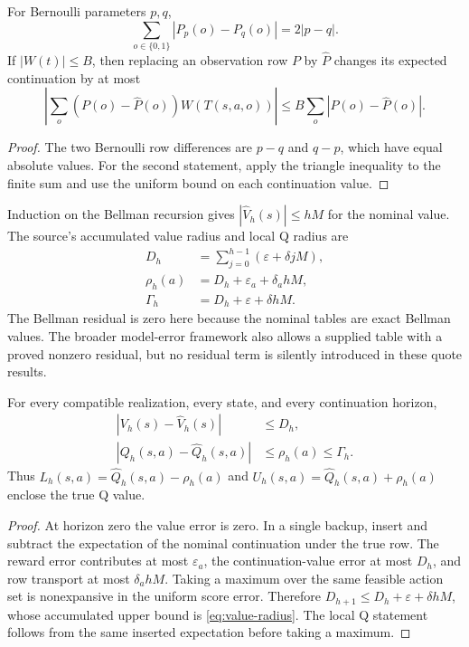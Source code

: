 \begin{lemma}
For Bernoulli parameters $p,q$,
\[
 \sum_{o\in\{0,1\}}|P_p(o)-P_q(o)|=2|p-q|.
\]
If $|W(t)|\leq B$, then replacing an observation row $P$ by $\widehat P$
changes its expected continuation by at most
\[
 \left|\sum_o(P(o)-\widehat P(o))W(T(s,a,o))\right|
 \leq B\sum_o|P(o)-\widehat P(o)|.
\]
\end{lemma}
\begin{proof}
The two Bernoulli row differences are $p-q$ and $q-p$, which have equal
absolute values. For the second statement, apply the triangle inequality to the
finite sum and use the uniform bound on each continuation value.
\end{proof}

Induction on the Bellman recursion gives $|\widehat V_h(s)|\leq hM$ for the
nominal value. The source's accumulated value radius and local Q radius are
\begin{align}
 D_h&=\sum_{j=0}^{h-1}(\varepsilon+\delta jM),\label{eq:value-radius}\\
 \rho_h(a)&=D_h+\varepsilon_a+\delta_a hM,\label{eq:local-radius}\\
 \Gamma_h&=D_h+\varepsilon+\delta hM.\label{eq:global-radius}
\end{align}
The Bellman residual is zero here because the nominal tables are exact Bellman
values. The broader model-error framework also allows a supplied table with a
proved nonzero residual, but no residual term is silently introduced in these
quote results.

\begin{theorem}
For every compatible realization, every state, and every continuation horizon,
\begin{align}
 |V_h(s)-\widehat V_h(s)|&\leq D_h,\\
 |Q_h(s,a)-\widehat Q_h(s,a)|&\leq\rho_h(a)\leq\Gamma_h.
\end{align}
Thus $L_h(s,a)=\widehat Q_h(s,a)-\rho_h(a)$ and
$U_h(s,a)=\widehat Q_h(s,a)+\rho_h(a)$ enclose the true Q value.
\end{theorem}
\begin{proof}
At horizon zero the value error is zero. In a single backup, insert and subtract
the expectation of the nominal continuation under the true row. The reward
error contributes at most $\varepsilon_a$, the continuation-value error at most
$D_h$, and row transport at most $\delta_a hM$. Taking a maximum over the same
feasible action set is nonexpansive in the uniform score error. Therefore
$D_{h+1}\leq D_h+\varepsilon+\delta hM$, whose accumulated upper bound is
\eqref{eq:value-radius}. The local Q statement follows from the same inserted
expectation before taking a maximum.
\end{proof}

